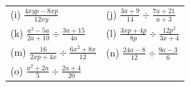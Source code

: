 \begin{enumerate}[noitemsep, label=\textbf{\arabic*}. ]
{\begin{center}
\begin{xtabular*}{\mytablewidth}[t]{|p{10\mystarwidth}|p{10\mystarwidth}|}
     \tabularnewline{}
        (i) $\frac{4xyp-8xp}{12xy}$\hspace{1ex} &
        (j) $\frac{3a+9}{14}÷\frac{7a+21}{a+3}$\hspace{1ex}%
     \tabularnewline{}
        (k) $\frac{{a}^{2}-5a}{2a+10}÷\frac{3a+15}{4a}$\hspace{1ex} &
        (l) $\frac{3xp+4p}{8p}÷\frac{12{p}^{2}}{3x+4}$\hspace{1ex}%
     \tabularnewline{}
        (m) $\frac{16}{2xp+4x}÷\frac{6{x}^{2}+8x}{12}$\hspace{1ex} &
        (n) $\frac{24a-8}{12}÷\frac{9a-3}{6}$\hspace{1ex}%
     \tabularnewline{}
        (o) $\frac{{a}^{2}+2a}{5}÷\frac{2a+4}{20}$\hspace{1ex} &

\end{xtabular*}
\end{center}}
\end{enumerate}
